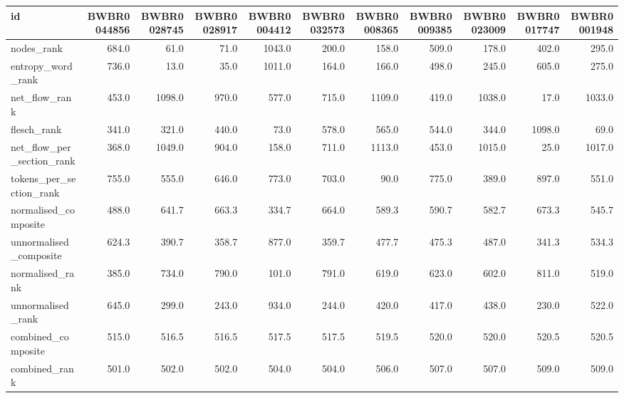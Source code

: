 \begin{tabular}{lrrrrrrrrrr}
\toprule
id & BWBR0044856 & BWBR0028745 & BWBR0028917 & BWBR0004412 & BWBR0032573 & BWBR0008365 & BWBR0009385 & BWBR0023009 & BWBR0017747 & BWBR0001948 \\
\midrule
nodes\_rank & 684.0 & 61.0 & 71.0 & 1043.0 & 200.0 & 158.0 & 509.0 & 178.0 & 402.0 & 295.0 \\
\cline{1-11}
entropy\_word\_rank & 736.0 & 13.0 & 35.0 & 1011.0 & 164.0 & 166.0 & 498.0 & 245.0 & 605.0 & 275.0 \\
\cline{1-11}
net\_flow\_rank & 453.0 & 1098.0 & 970.0 & 577.0 & 715.0 & 1109.0 & 419.0 & 1038.0 & 17.0 & 1033.0 \\
\cline{1-11}
flesch\_rank & 341.0 & 321.0 & 440.0 & 73.0 & 578.0 & 565.0 & 544.0 & 344.0 & 1098.0 & 69.0 \\
\cline{1-11}
net\_flow\_per\_section\_rank & 368.0 & 1049.0 & 904.0 & 158.0 & 711.0 & 1113.0 & 453.0 & 1015.0 & 25.0 & 1017.0 \\
\cline{1-11}
tokens\_per\_section\_rank & 755.0 & 555.0 & 646.0 & 773.0 & 703.0 & 90.0 & 775.0 & 389.0 & 897.0 & 551.0 \\
\cline{1-11}
normalised\_composite & 488.0 & 641.7 & 663.3 & 334.7 & 664.0 & 589.3 & 590.7 & 582.7 & 673.3 & 545.7 \\
\cline{1-11}
unnormalised\_composite & 624.3 & 390.7 & 358.7 & 877.0 & 359.7 & 477.7 & 475.3 & 487.0 & 341.3 & 534.3 \\
\cline{1-11}
normalised\_rank & 385.0 & 734.0 & 790.0 & 101.0 & 791.0 & 619.0 & 623.0 & 602.0 & 811.0 & 519.0 \\
\cline{1-11}
unnormalised\_rank & 645.0 & 299.0 & 243.0 & 934.0 & 244.0 & 420.0 & 417.0 & 438.0 & 230.0 & 522.0 \\
\cline{1-11}
combined\_composite & 515.0 & 516.5 & 516.5 & 517.5 & 517.5 & 519.5 & 520.0 & 520.0 & 520.5 & 520.5 \\
\cline{1-11}
combined\_rank & 501.0 & 502.0 & 502.0 & 504.0 & 504.0 & 506.0 & 507.0 & 507.0 & 509.0 & 509.0 \\
\cline{1-11}
\bottomrule
\end{tabular}
